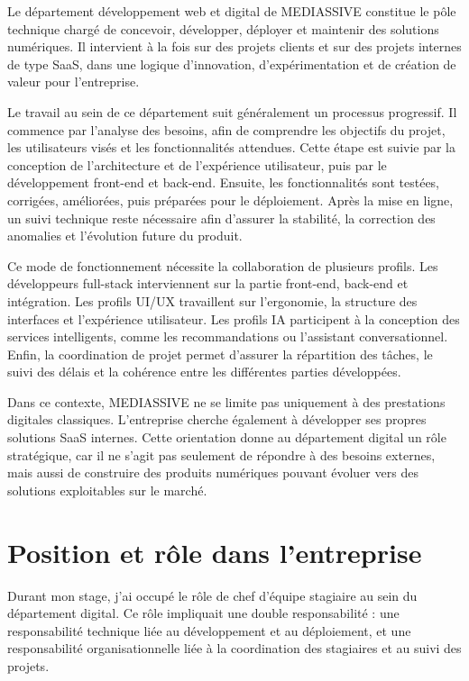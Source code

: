 Le département développement web et digital de MEDIASSIVE constitue le pôle technique chargé de concevoir, développer, déployer et maintenir des solutions numériques. Il intervient à la fois sur des projets clients et sur des projets internes de type SaaS, dans une logique d'innovation, d'expérimentation et de création de valeur pour l'entreprise.

Le travail au sein de ce département suit généralement un processus progressif. Il commence par l'analyse des besoins, afin de comprendre les objectifs du projet, les utilisateurs visés et les fonctionnalités attendues. Cette étape est suivie par la conception de l'architecture et de l'expérience utilisateur, puis par le développement front-end et back-end. Ensuite, les fonctionnalités sont testées, corrigées, améliorées, puis préparées pour le déploiement. Après la mise en ligne, un suivi technique reste nécessaire afin d'assurer la stabilité, la correction des anomalies et l'évolution future du produit.

Ce mode de fonctionnement nécessite la collaboration de plusieurs profils. Les développeurs full-stack interviennent sur la partie front-end, back-end et intégration. Les profils UI/UX travaillent sur l'ergonomie, la structure des interfaces et l'expérience utilisateur. Les profils IA participent à la conception des services intelligents, comme les recommandations ou l'assistant conversationnel. Enfin, la coordination de projet permet d'assurer la répartition des tâches, le suivi des délais et la cohérence entre les différentes parties développées.

Dans ce contexte, MEDIASSIVE ne se limite pas uniquement à des prestations digitales classiques. L'entreprise cherche également à développer ses propres solutions SaaS internes. Cette orientation donne au département digital un rôle stratégique, car il ne s'agit pas seulement de répondre à des besoins externes, mais aussi de construire des produits numériques pouvant évoluer vers des solutions exploitables sur le marché.

\section{Position et rôle dans l'entreprise}

Durant mon stage, j'ai occupé le rôle de chef d'équipe stagiaire au sein du département digital. Ce rôle impliquait une double responsabilité : une responsabilité technique liée au développement et au déploiement, et une responsabilité organisationnelle liée à la coordination des stagiaires et au suivi des projets.

